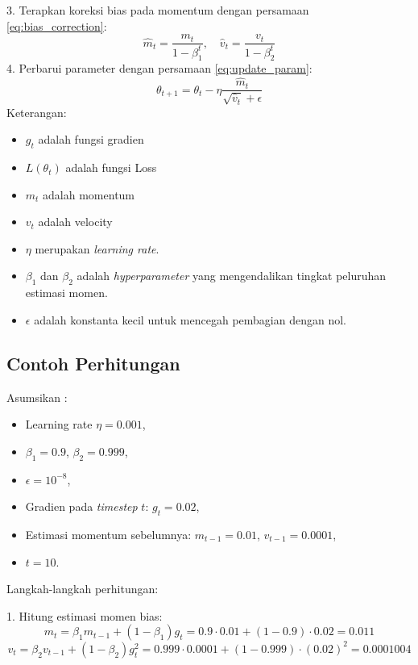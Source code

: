 3. Terapkan koreksi bias pada momentum dengan persamaan \ref{eq:bias_correction}:
\begin{equation}
    \hat{m}_t = \frac{m_t}{1 - \beta_1^t}, \quad \hat{v}_t = \frac{v_t}{1 - \beta_2^t}
    \label{eq:bias_correction}
\end{equation}
4. Perbarui parameter dengan persamaan \ref{eq:update_param}:
\begin{equation}
    \theta_{t+1} = \theta_t - \eta \frac{\hat{m}_t}{\sqrt{\hat{v}_t} + \epsilon}
    \label{eq:update_param}
\end{equation}
Keterangan:
\begin{itemize}
    \item $g_t$ adalah fungsi gradien
    \item $L(\theta_t)$ adalah fungsi Loss
    \item $m_t$ adalah momentum
    \item $v_t$ adalah velocity
    \item $\eta$ merupakan \textit{learning rate}.
    \item $\beta_1$ dan $\beta_2$ adalah \textit{hyperparameter} yang mengendalikan tingkat peluruhan estimasi momen.
    \item $\epsilon$ adalah konstanta kecil untuk mencegah pembagian dengan nol.
\end{itemize}


\subsection{Contoh Perhitungan}
Asumsikan :

\begin{itemize}
  \item Learning rate $\eta = 0.001$,
  \item $\beta_1 = 0.9$, $\beta_2 = 0.999$,
  \item $\epsilon = 10^{-8}$,
  \item Gradien pada \textit{timestep} $t$: $g_t = 0.02$,
  \item Estimasi momentum sebelumnya: $m_{t-1} = 0.01$, $v_{t-1} = 0.0001$,
  \item $t = 10$.
\end{itemize}


Langkah-langkah perhitungan:

1. Hitung estimasi momen bias:
\[
m_t = \beta_1 m_{t-1} + (1 - \beta_1) g_t = 0.9 \cdot 0.01 + (1 - 0.9) \cdot 0.02 = 0.011
\]
\[
v_t = \beta_2 v_{t-1} + (1 - \beta_2) g_t^2 = 0.999 \cdot 0.0001 + (1 - 0.999) \cdot (0.02)^2 = 0.0001004
\]

